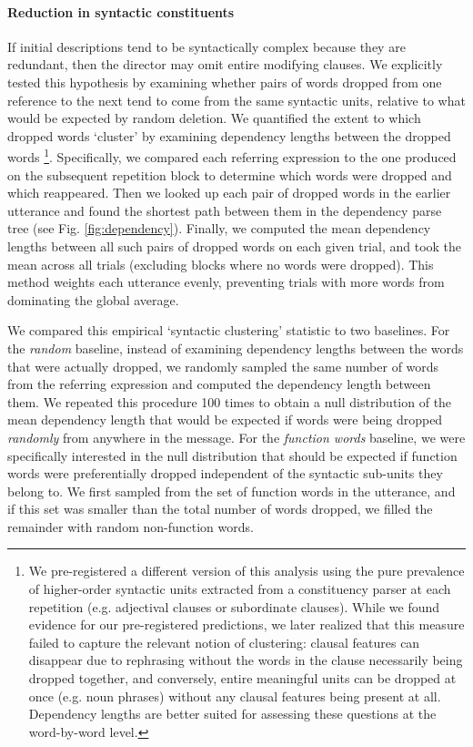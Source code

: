 \documentclass[alpha-refs]{wiley-article}
\begin{document}
\paragraph{Reduction in syntactic constituents}
If initial descriptions tend to be syntactically complex because they are redundant, then the director may omit entire modifying clauses.
We explicitly tested this hypothesis by examining whether pairs of words dropped from one reference to the next tend to come from the same syntactic units, relative to what would be expected by random deletion.
We quantified the extent to which dropped words `cluster' by examining dependency lengths between the dropped words \citep{jurafsky2014speech,futrell2015large}\footnote{We pre-registered a different version of this analysis using the pure prevalence of higher-order syntactic units  extracted from a constituency parser at each repetition (e.g. adjectival clauses or subordinate clauses). While we found evidence for our pre-registered predictions, we later realized that this measure failed to capture the relevant notion of clustering: clausal features can disappear due to rephrasing without the words in the clause necessarily being dropped together, and conversely, entire meaningful units can be dropped at once (e.g. noun phrases) without any clausal features being present at all. Dependency lengths are better suited for assessing these questions at the word-by-word level.}.
Specifically, we compared each referring expression to the one produced on the subsequent repetition block to determine which words were dropped and which reappeared.
Then we looked up each pair of dropped words in the earlier utterance and found the shortest path between them in the dependency parse tree (see Fig. \ref{fig:dependency}).
Finally, we computed the mean dependency lengths between all such pairs of dropped words on each given trial, and took the mean across all trials (excluding blocks where no words were dropped).
This method weights each utterance evenly, preventing trials with more words from dominating the global average.

We compared this empirical `syntactic clustering' statistic to two baselines.
For the \emph{random} baseline, instead of examining dependency lengths between the words that were actually dropped, we randomly sampled the same number of words from the referring expression and computed the dependency length between them.
We repeated this procedure 100 times to obtain a null distribution of the mean dependency length that would be expected if words were being dropped \emph{randomly} from anywhere in the message.
For the \emph{function words} baseline, we were specifically interested in the null distribution that should be expected if function words were preferentially dropped independent of the syntactic sub-units they belong to.
We first sampled from the set of function words in the utterance, and if this set was smaller than the total number of words dropped, we filled the remainder with random non-function words.
\end{document}
